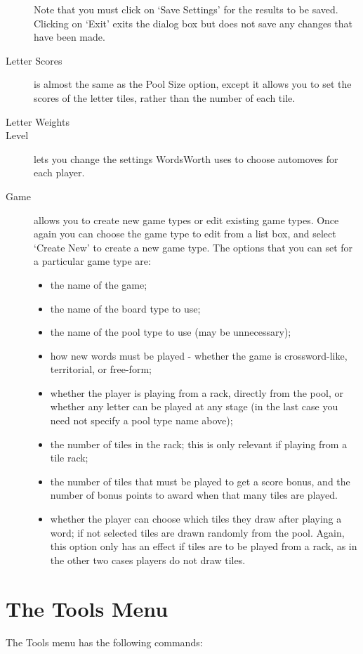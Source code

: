 \begin{description}
Note that you must click on `Save Settings' for the results to be
saved. Clicking on `Exit' exits the dialog box but does not save any
changes that have been made.
\item [Letter Scores] is almost the same as the Pool Size
option, except it allows you to set the scores of the letter tiles,
rather than the number of each tile.
\item [Letter Weights]
\item [Level] lets you change the settings WordsWorth uses to choose 
automoves for each player.
\item [Game] allows you to create new game types or edit
existing game types. Once again you can choose the game type to edit
from a list box, and select `Create New' to create a new game type.
The options that you can set for a particular game type are:

\begin{itemize}
\item the name of the game;
\item the name of the board type to use;
\item the name of the pool type to use (may be unnecessary);
\item how new words must be played - whether the game is
crossword-like, territorial, or free-form;
\item whether the player is playing from a rack, directly from the
pool, or whether any letter can be played at any stage (in the last
case you need not specify a pool type name above);
\item the number of tiles in the rack; this is only relevant if
playing from a tile rack;
\item the number of tiles that must be played to get a score bonus,
and the number of bonus points to award when that many tiles are
played.
\item whether the player can choose which tiles they draw after
playing a word; if not selected tiles are drawn randomly from the
pool. Again, this option only has an effect if tiles are to be played
from a rack, as in the other two cases players do not draw tiles.
\end{itemize}
\end{description}

\section{The Tools Menu}

The Tools menu has the following commands:

